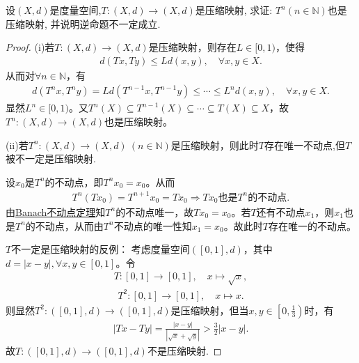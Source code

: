 \documentclass[../../main.tex]{subfiles}%
\begin{document}
\begin{example}
设$(X,d)$是度量空间,$T:(X,d)\to (X,d)$是压缩映射, 求证: $T^n(n\in\mathbb{N})$也是压缩映射, 并说明逆命题不一定成立.
\end{example}
\begin{proof}
(i)若$T:(X,d)\to(X,d)$是压缩映射，则存在$L\in[0,1)$，使得
\begin{align*}
d(Tx,Ty)\leqslant Ld(x,y),\quad \forall x,y\in X.
\end{align*}
从而对$\forall n\in\mathbb{N}$，有
\begin{align*}
d(T^nx,T^ny)=Ld(T^{n-1}x,T^{n-1}y)\leqslant\cdots\leqslant L^nd(x,y),\quad \forall x,y\in X.
\end{align*}
显然$L^n\in[0,1)$。又$T^n(X)\subseteq T^{n-1}(X)\subseteq\cdots\subseteq T(X)\subseteq X$，故$T^n:(X,d)\to(X,d)$也是压缩映射。

(ii)若$T^n:(X,d)\to(X,d)\ (n\in\mathbb{N})$是压缩映射，则此时$T$存在唯一不动点,但$T$被不一定是压缩映射.

设$x_0$是$T^n$的不动点，即$T^nx_0=x_0$。从而
\begin{align*}
T^n(Tx_0)=T^{n+1}x_0=Tx_0\Longrightarrow Tx_0\text{也是}T^n\text{的不动点}.
\end{align*}
由\hyperref[theorem:Banach不动点定理——压缩映象原理]{Banach不动点定理}知$T^n$的不动点唯一，故$Tx_0=x_0$。若$T$还有不动点$x_1$，则$x_1$也是$T^n$的不动点，从而由$T^n$不动点的唯一性知$x_1=x_0$。故此时$T$存在唯一的不动点。

$T$不一定是压缩映射的反例：
考虑度量空间$([0,1],d)$，其中$d=|x-y|,\forall x,y\in[0,1]$。令
\begin{align*}
T:[0,1]\to[0,1],\quad x\mapsto \sqrt{x},
\end{align*}
\begin{align*}
T^2:[0,1]\to[0,1],\quad x\mapsto x.
\end{align*}
则显然$T^2:([0,1],d)\to([0,1],d)$是压缩映射，但当$x,y\in\left[0,\frac{1}{3}\right)$时，有
\begin{align*}
|Tx-Ty|=\frac{|x-y|}{|\sqrt{x}+\sqrt{y}|}>\frac{3}{2}|x-y|.
\end{align*}
故$T:([0,1],d)\to([0,1],d)$不是压缩映射.
\end{proof}
\end{document}
